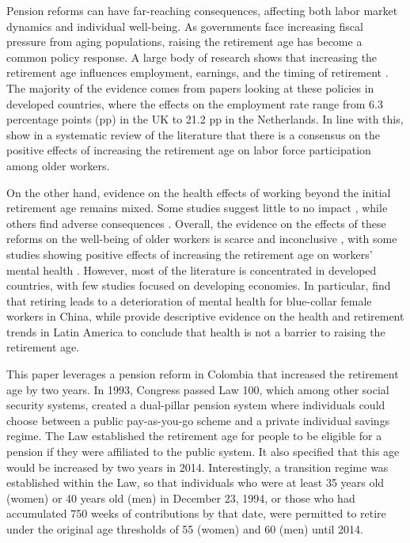 \documentclass[12pt, a4paper]{article}
\begin{document}
Pension reforms can have far-reaching consequences, affecting both labor market dynamics and individual well-being. As governments face increasing fiscal pressure from aging populations, raising the retirement age has become a common policy response. A large body of research shows that increasing the retirement age influences employment, earnings, and the timing of retirement \citep{geyer2020labor,hernaes2016pension,sanchez2014delaying,cribb2016signals,de2018social,geyer2021closing,rabate2020employment,atalay2015impact,staubli2013does,rabate2024increasing}. The majority of the evidence comes from papers looking at these policies in developed countries, where the effects on the employment rate range from 6.3 percentage points (pp) in the UK to 21.2 pp in the Netherlands. In line with this, \citet{pilipiec2021effect} show in a systematic review of the literature that there is a consensus on the positive effects of increasing the retirement age on labor force participation among older workers.

On the other hand, evidence on the health effects of working beyond the initial retirement age remains mixed. Some studies suggest little to no impact \citep{hagen2018effects}, while others find adverse consequences \citep{coe2011retirement}. Overall, the evidence on the effects of these reforms on the well-being of older workers is scarce and inconclusive \citep{pilipiec2021effect}, with some studies showing positive effects of increasing the retirement age on workers' mental health \citep{maimaris2010impact}. However, most of the literature is concentrated in developed countries, with few studies focused on developing economies. In particular, \citet{wang2024occupational} find that retiring leads to a deterioration of mental health for blue-collar female workers in China, while \citet{de2019trends} provide descriptive evidence on the health and retirement trends in Latin America to conclude that health is not a barrier to raising the retirement age. 

This paper leverages a pension reform in Colombia that increased the retirement age by two years. In 1993, Congress passed Law 100, which among other social security systems, created a dual-pillar pension system where individuals could choose between a public pay-as-you-go scheme and a private individual savings regime. The Law established the retirement age for people to be eligible for a pension if they were affiliated to the public system. It also specified that this age would be increased by two years in 2014. Interestingly, a transition regime was established within the Law, so that individuals who were at least 35 years old (women) or 40 years old (men) in December 23, 1994, or those who had accumulated 750 weeks of contributions by that date, were permitted to retire under the original age thresholds of 55 (women) and 60 (men) until 2014.
\end{document}
